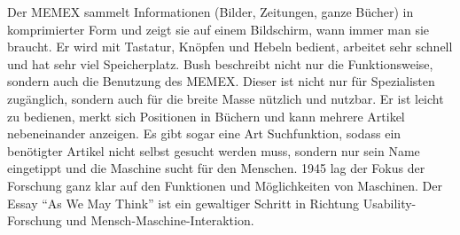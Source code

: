 Der MEMEX sammelt Informationen (Bilder, Zeitungen, ganze Bücher) in komprimierter Form und zeigt sie auf einem Bildschirm, wann immer man sie braucht. Er wird mit Tastatur, Knöpfen und Hebeln bedient, arbeitet sehr schnell und hat sehr viel Speicherplatz.
Bush beschreibt nicht nur die Funktionsweise, sondern auch die Benutzung des MEMEX. Dieser ist nicht nur für Spezialisten zugänglich, sondern auch für die breite Masse nützlich und nutzbar. Er ist leicht zu bedienen, merkt sich Positionen in Büchern und kann mehrere Artikel nebeneinander anzeigen. Es gibt sogar eine Art Suchfunktion, sodass ein benötigter Artikel nicht selbst gesucht werden muss, sondern nur sein Name eingetippt und die Maschine sucht für den Menschen.
1945 lag der Fokus der Forschung ganz klar auf den Funktionen und Möglichkeiten von Maschinen. Der Essay \enquote{As We May Think} ist ein gewaltiger Schritt in Richtung Usability-Forschung und Mensch-Maschine-Interaktion.
